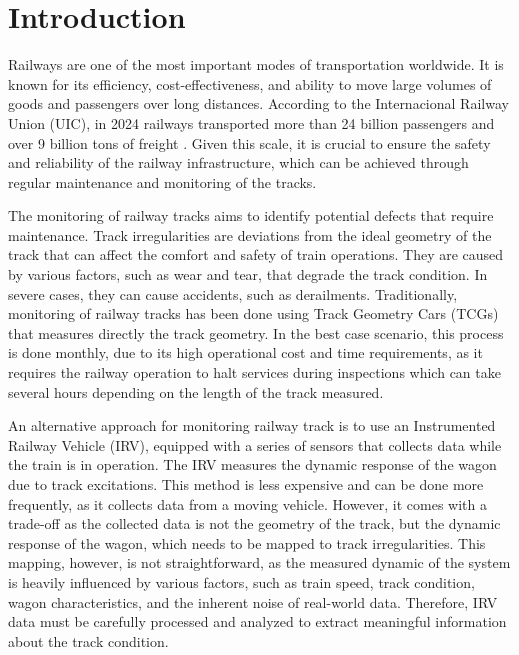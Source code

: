 \chapter[Introduction]{Introduction}

Railways are one of the most important modes of transportation worldwide. It is known for its efficiency, cost-effectiveness, and ability to move large volumes of goods and passengers over long distances. According to the Internacional Railway Union (UIC), in 2024 railways transported more than 24 billion passengers and over 9 billion tons of freight \cite{UIC_2024}. Given this scale, it is crucial to ensure the safety and reliability of the railway infrastructure, which can be achieved through regular maintenance and monitoring of the tracks.  

The monitoring of railway tracks aims to identify potential defects that require maintenance. Track irregularities are deviations from the ideal geometry of the track that can affect the comfort and safety of train operations. They are caused by various factors, such as wear and tear, that degrade the track condition. In severe cases, they can cause accidents, such as derailments. Traditionally, monitoring of railway tracks has been done using Track Geometry Cars (TCGs) that measures directly the track geometry. In the best case scenario, this process is done monthly, due to its high operational cost and time requirements, as it requires the railway operation to halt services during inspections which can take several hours depending on the length of the track measured.

An alternative approach for monitoring railway track is to use an Instrumented Railway Vehicle (IRV), equipped with a series of sensors that collects data while the train is in operation. The IRV measures the dynamic response of the wagon due to track excitations. This method is less expensive and can be done more frequently, as it collects data from a moving vehicle. However, it comes with a trade-off as the collected data is not the geometry of the track, but the dynamic response of the wagon, which needs to be mapped to track irregularities. This mapping, however, is not straightforward, as the measured dynamic of the system is heavily influenced by various factors, such as train speed, track condition, wagon characteristics, and the inherent noise of real-world data. Therefore, IRV data must be carefully processed and analyzed to extract meaningful information about the track condition.

